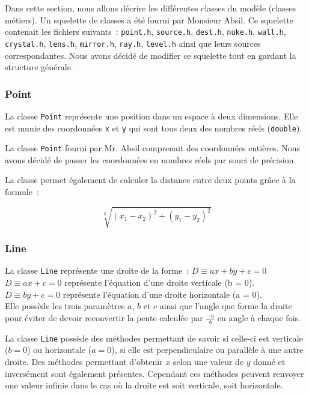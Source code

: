 \documentclass[]{report}
\begin{document}
Dans cette section, nous allons décrire les différentes classes du modèle 
(classes métiers).
Un squelette de classes a été fourni par Monsieur Absil.
Ce squelette contenait les fichiers suivants~:
\texttt{point.h}, \texttt{source.h}, \texttt{dest.h}, \texttt{nuke.h}, \texttt{wall.h},
\texttt{crystal.h}, \texttt{lens.h}, \texttt{mirror.h}, \texttt{ray.h}, \texttt{level.h} ainsi que leurs sources correspondantes.
Nous avons décidé de modifier ce squelette tout en gardant la 
structure générale.

\subsubsection{\label{Point}Point}

La classe \texttt{Point} représente une position dans un espace à deux dimensions. 
Elle est munie des coordonnées \texttt{x} et \texttt{y} qui sont tous deux des
nombres réels (\texttt{double}). 

La classe \texttt{Point} fourni par Mr. Absil comprenait des coordonnées entières.
Nous avons décidé de passer les coordonnées en nombres réels par souci de précision.

La classe permet également de calculer la distance entre deux points grâce à la formule~:

$$ \sqrt[2]{(x_1 - x_2)^2 + (y_1 - y_2)^2} $$

\newpage
\subsubsection{\label{Line}Line}

La classe \texttt{Line} représente une droite de la forme~: 
$ D \equiv ax + by + c = 0 $ \\

$ D \equiv ax + c = 0 $ représente l'équation d'une droite verticale (b = 0). \\
$ D \equiv by + c = 0 $ représente l'équation d'une droite horizontale (a = 0). \\

Elle possède les trois paramètres $ a $, $ b $ et $ c $ ainsi que l'angle
que forme la droite pour éviter de devoir reconvertir la pente calculée par $ \frac{-a}{b} $
en angle à chaque fois.

La classe \texttt{Line} possède des méthodes permettant de savoir si celle-ci est 
verticale ($ b = 0 $) ou horizontale ($ a = 0 $), si elle est perpendiculaire ou parallèle à une autre droite.
Des méthodes permettant d'obtenir $ x $ selon une valeur de $ y $ donné et inversément sont également
présentes. Cependant ces méthodes peuvent renvoyer une valeur infinie dans le cas où la droite 
est soit verticale, soit horizontale.
\end{document}
